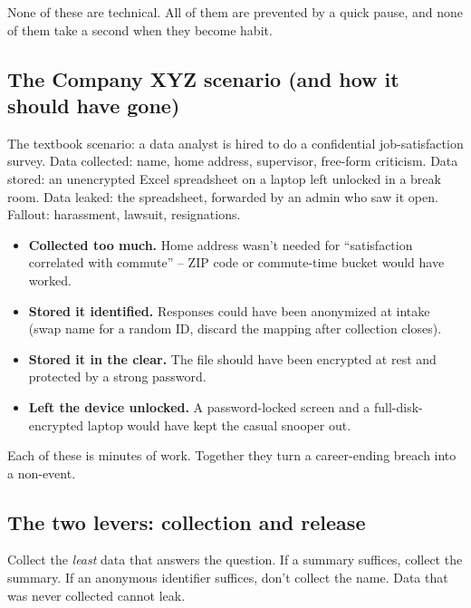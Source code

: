 \documentclass[11pt]{article}
\begin{document}
None of these are technical. All of them are prevented by a quick
pause, and none of them take a second when they become habit.

\subsection{The Company XYZ scenario (and how it should have gone)}

The textbook scenario: a data analyst is hired to do a confidential
job-satisfaction survey. Data collected: name, home address,
supervisor, free-form criticism. Data stored: an unencrypted Excel
spreadsheet on a laptop left unlocked in a break room. Data leaked:
the spreadsheet, forwarded by an admin who saw it open. Fallout:
harassment, lawsuit, resignations.

\begin{examplebox}
\begin{itemize}[leftmargin=*,noitemsep]
    \item \textbf{Collected too much.} Home address wasn't needed for
          ``satisfaction correlated with commute'' -- ZIP code or
          commute-time bucket would have worked.
    \item \textbf{Stored it identified.} Responses could have been
          anonymized at intake (swap name for a random ID, discard the
          mapping after collection closes).
    \item \textbf{Stored it in the clear.} The file should have been
          encrypted at rest and protected by a strong password.
    \item \textbf{Left the device unlocked.} A password-locked screen
          and a full-disk-encrypted laptop would have kept the casual
          snooper out.
\end{itemize}
Each of these is minutes of work. Together they turn a career-ending
breach into a non-event.
\end{examplebox}

\subsection{The two levers: collection and release}

\begin{defnbox}
Collect the \emph{least} data that answers the question. If a
summary suffices, collect the summary. If an anonymous identifier
suffices, don't collect the name. Data that was never collected
cannot leak.
\end{defnbox}
\end{document}
